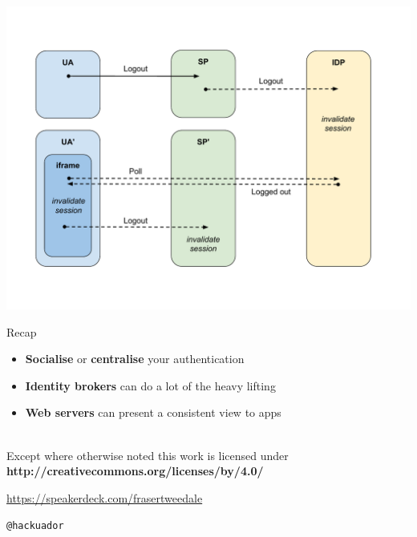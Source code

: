 \documentclass[ignorenonframetext,aspectratio=169]{beamer}
\providecommand{\tightlist}{%
  \setlength{\itemsep}{0pt}\setlength{\parskip}{0pt}}
\begin{document}
\begin{frame}[plain]
\centering
\includegraphics[height=\paperheight]{fedsso-logout-frontchannel.pdf}
\end{frame}

\begin{frame}{Recap}

\begin{itemize}
\tightlist
\item {\bf Socialise} or {\bf centralise} your authentication
\item \textbf{Identity brokers} can do a lot of the heavy lifting
\item \textbf{Web servers} can present a consistent view to apps
\end{itemize}

\end{frame}

\begin{frame}[plain]




    \setlength{\parskip}{.5em}

    { \centering

    
    \\
    { \scriptsize
    Except where otherwise noted this work is licensed under
    }\\
    { \footnotesize
    \textbf{http://creativecommons.org/licenses/by/4.0/}
    }

    \bigskip
    \Large

    \url{https://speakerdeck.com/frasertweedale}

    \texttt{@hackuador}

    }


\end{frame}
\end{document}

